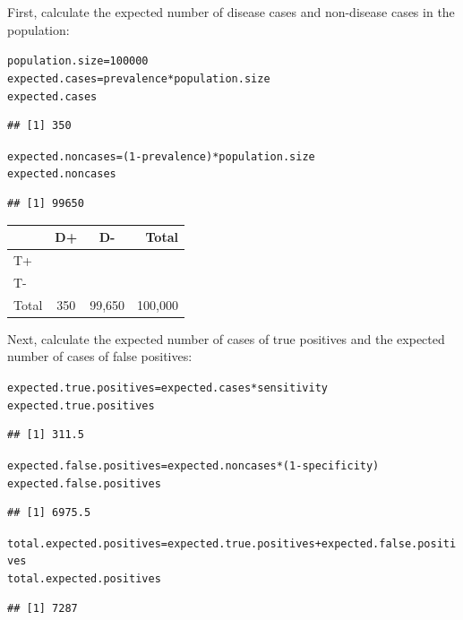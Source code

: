 \documentclass{report}\usepackage[]{graphicx}\usepackage[]{color}
\makeatletter
\newcommand{\hlnum}[1]{\textcolor[rgb]{0.686,0.059,0.569}{#1}}%
\newcommand{\hlopt}[1]{\textcolor[rgb]{0,0,0}{#1}}%
\newcommand{\hlstd}[1]{\textcolor[rgb]{0.345,0.345,0.345}{#1}}%
\newcommand{\hlkwb}[1]{\textcolor[rgb]{0.69,0.353,0.396}{#1}}%
\newenvironment{kframe}{%
 \def\at@end@of@kframe{}%
 \ifinner\ifhmode%
  \def\at@end@of@kframe{\end{minipage}}%
  \begin{minipage}{\columnwidth}%
 \fi\fi%
 \def\FrameCommand##1{\hskip\@totalleftmargin \hskip-\fboxsep
 \colorbox{shadecolor}{##1}\hskip-\fboxsep
     \hskip-\linewidth \hskip-\@totalleftmargin \hskip\columnwidth}%
 \MakeFramed {\advance\hsize-\width
   \@totalleftmargin\z@ \linewidth\hsize
   \@setminipage}}%
 {\par\unskip\endMakeFramed%
 \at@end@of@kframe}
\newenvironment{knitrout}{}{} %
\makeatother
\begin{document}
First, calculate the expected number of disease cases and non-disease cases in the population:
\begin{knitrout}
\color{fgcolor}\begin{kframe}
\begin{alltt}
\hlstd{population.size} \hlkwb{=} \hlnum{100000}
\hlstd{expected.cases} \hlkwb{=} \hlstd{prevalence} \hlopt{*} \hlstd{population.size}
\hlstd{expected.cases}
\end{alltt}
\begin{verbatim}
## [1] 350
\end{verbatim}
\begin{alltt}
\hlstd{expected.noncases} \hlkwb{=} \hlstd{(}\hlnum{1} \hlopt{-} \hlstd{prevalence)} \hlopt{*} \hlstd{population.size}
\hlstd{expected.noncases}
\end{alltt}
\begin{verbatim}
## [1] 99650
\end{verbatim}
\end{kframe}
\end{knitrout}

\begin{center}
\begin{tabular}{|l|c|c|r|}
\hline 
& D+ & D- & Total\\ 
\hline
T+ & & & \\ 
\hline
T- & & & \\ 
\hline 
Total & 350 & 99,650 & 100,000 \\ 
\hline 
\end{tabular} 
\end{center}

Next, calculate the expected number of cases of true positives and the expected number of cases of false positives:  
\begin{knitrout}
\color{fgcolor}\begin{kframe}
\begin{alltt}
\hlstd{expected.true.positives} \hlkwb{=} \hlstd{expected.cases} \hlopt{*} \hlstd{sensitivity}
\hlstd{expected.true.positives}
\end{alltt}
\begin{verbatim}
## [1] 311.5
\end{verbatim}
\begin{alltt}
\hlstd{expected.false.positives} \hlkwb{=} \hlstd{expected.noncases} \hlopt{*} \hlstd{(}\hlnum{1} \hlopt{-} \hlstd{specificity)}
\hlstd{expected.false.positives}
\end{alltt}
\begin{verbatim}
## [1] 6975.5
\end{verbatim}
\begin{alltt}
\hlstd{total.expected.positives} \hlkwb{=} \hlstd{expected.true.positives} \hlopt{+} \hlstd{expected.false.positives}
\hlstd{total.expected.positives}
\end{alltt}
\begin{verbatim}
## [1] 7287
\end{verbatim}
\end{kframe}
\end{knitrout}
\end{document}
